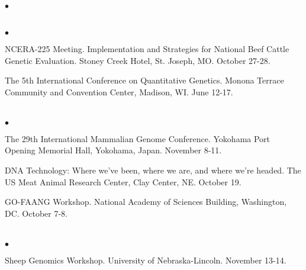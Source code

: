 \documentclass[margin,line,10pt]{res}
\newenvironment{list2}{
  \begin{list}{$\bullet$}{%
      \setlength{\itemsep}{0in}
      \setlength{\parsep}{0in} \setlength{\parskip}{0in}
      \setlength{\topsep}{0in} \setlength{\partopsep}{0in} 
      \setlength{\leftmargin}{0.2in}}}{\end{list}}
\begin{document}
\begin{resume}
\begin{list2}
  
  \end{list2}  


\section{}
\begin{list2}

\item NCERA-225 Meeting. Implementation and Strategies for National Beef Cattle Genetic Evaluation. Stoney Creek Hotel, St. Joseph, MO. October 27-28. 

  \vspace{0.5cm}
  
\item The 5th International Conference on Quantitative Genetics. Monona Terrace Community and Convention Center, Madison, WI. June 12-17. 

\end{list2}  




\section{}
\begin{list2}
  
\item The 29th International Mammalian Genome Conference. Yokohama Port Opening Memorial Hall, Yokohama, Japan. November 8-11. 

  \vspace{0.5cm}
  
  \item DNA Technology: Where we've been, where we are, and where we're headed. The US Meat Animal Research Center, Clay Center, NE. October 19. 
  
  \vspace{0.5cm}
  
\item GO-FAANG Workshop. National Academy of Sciences Building, Washington, DC. October 7-8. 
\end{list2}  

\section{}
\begin{list2}

\item Sheep Genomics Workshop. University of Nebraska-Lincoln. November 13-14.  


\end{list2}
\end{resume}
\end{document}

